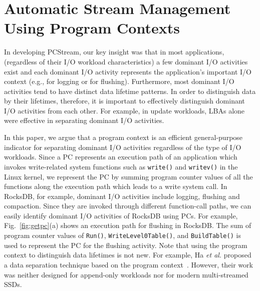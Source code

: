 \section{Automatic Stream Management Using Program Contexts}

In developing \textsf{\small PCStream}, our key insight was that in most applications,
(regardless of their I/O workload characteristics)
a few dominant I/O activities exist
and each dominant I/O activity   
represents the application's important I/O context (e.g., for logging or for flushing). 
Furthermore, most dominant I/O activities tend to have distinct data lifetime patterns.
In order to distinguish data by their lifetimes, therefore, 
it is important to effectively distinguish dominant I/O activities from each other.  
For example, in update workloads, 
LBAs alone were effective in separating dominant I/O activities.  

In this paper, we argue that a program context is an efficient  general-purpose
indicator for separating dominant I/O activities regardless of the type of I/O
workloads.  Since a PC represents an execution path of an application which
invokes write-related system functions such as {\tt write()} and {\tt writev()}
in the Linux kernel,  we represent the PC by summing program counter values of
all the functions along the execution path which leads to a write system call.
In RocksDB, for example, dominant I/O activities include logging, flushing and
compaction.  Since they are invoked through different function-call paths, we
can easily identify dominant I/O activities of RocksDB using PCs.  For example,
Fig.~\ref{fig:getpc}(a) shows an execution path for flushing in RocksDB.  The
sum of program counter values of \texttt{Run()}, \texttt{WriteLevel0Table()},
and \texttt{BuildTable()} is used to represent the PC for the flushing
activity.  Note that using the program context to distinguish data lifetimes is
not new.  For example, Ha {\it et al.} proposed a data separation technique
based on the program context~\cite{PCHa}.   However, their work was neither
designed for append-only workloads nor for modern multi-streamed SSDs.

